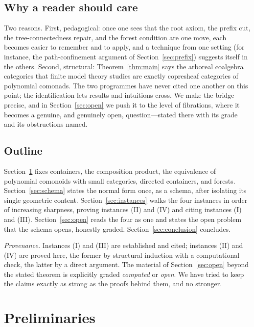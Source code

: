 \documentclass[11pt,reqno]{amsart}
\theoremstyle{plain}
\theoremstyle{definition}
\begin{document}
\subsection*{Why a reader should care}
Two reasons. First, pedagogical: once one sees that the root axiom, the prefix cut, the
tree-connectedness repair, and the forest condition are one move, each becomes easier to remember and
to apply, and a technique from one setting (for instance, the path-confinement argument of
Section~\ref{sec:prefix}) suggests itself in the others. Second, structural: Theorem~\ref{thm:main}
says the arboreal coalgebra categories that finite model theory studies are exactly copresheaf
categories of polynomial comonads. The two programmes have never cited one another on this point; the
identification lets results and intuitions cross. We make the bridge precise, and in
Section~\ref{sec:open} we push it to the level of fibrations, where it becomes a genuine, and genuinely
open, question---stated there with its grade and its obstructions named.

\subsection*{Outline}
Section~\ref{sec:prelim} fixes containers, the composition product, the equivalence of polynomial
comonoids with small categories, directed containers, and forests. Section~\ref{sec:schema} states the
normal form once, as a schema, after isolating its single geometric content. Section~\ref{sec:instances}
walks the four instances in order of increasing sharpness, proving instances (II) and (IV) and citing
instances (I) and (III). Section~\ref{sec:open} reads the four as one and states the open problem that
the schema opens, honestly graded. Section~\ref{sec:conclusion} concludes.

\medskip
\noindent\emph{Provenance.} Instances (I) and (III) are established and cited; instances (II) and (IV)
are proved here, the former by structural induction with a computational check, the latter by a direct
argument. The material of Section~\ref{sec:open} beyond the stated theorem is explicitly graded
\emph{computed} or \emph{open}. We have tried to keep the claims exactly as strong as the proofs behind
them, and no stronger.

\section{Preliminaries}\label{sec:prelim}
\end{document}
